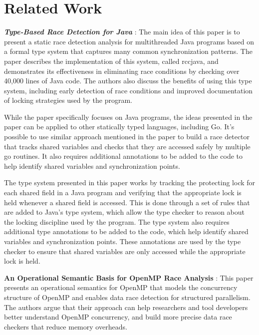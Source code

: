 \documentclass[12pt]{article}
\begin{document}
\section{Related Work}


\textbf{\textit{Type-Based Race Detection for Java}} \cite{type-based-static-analysis-for-race-detection}:
The main idea of this paper is to present a static race detection analysis for multithreaded Java programs based on a formal type system that captures many common synchronization patterns. The paper describes the implementation of this system, called rccjava, and demonstrates its effectiveness in eliminating race conditions by checking over 40,000 lines of Java code. The authors also discuss the benefits of using this type system, including early detection of race conditions and improved documentation of locking strategies used by the program.

While the paper specifically focuses on Java programs, the ideas presented in the paper can be applied to other statically typed languages, including Go. It's possible to use similar approach mentioned in the paper to build a race detector that tracks shared variables and checks that they are accessed safely by multiple go routines. It also requires additional annotations to be added to the code to help identify shared variables and synchronization points. 

The type system presented in this paper works by tracking the protecting lock for each shared field in a Java program and verifying that the appropriate lock is held whenever a shared field is accessed. This is done through a set of rules that are added to Java's type system, which allow the type checker to reason about the locking discipline used by the program. The type system also requires additional type annotations to be added to the code, which help identify shared variables and synchronization points. These annotations are used by the type checker to ensure that shared variables are only accessed while the appropriate lock is held.


\textbf{An Operational Semantic Basis for OpenMP Race Analysis} \cite{openmp-operational-semantics}:
This paper presents an operational semantics for OpenMP that models the concurrency structure of OpenMP and enables data race detection for structured parallelism. The authors argue that their approach can help researchers and tool developers better understand OpenMP concurrency, and build more precise data race checkers that reduce memory overheads.
\end{document}
